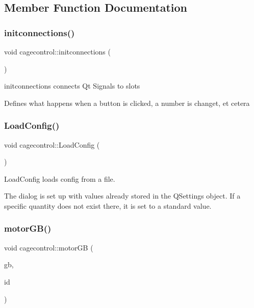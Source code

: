 \subsection{Member Function Documentation}
\mbox{\label{classcagecontrol_a56c01018dbd0d16a360106c438539c9e}} 
\subsubsection{\texorpdfstring{initconnections()}{initconnections()}}
{\footnotesize\ttfamily void cagecontrol\+::initconnections (\begin{DoxyParamCaption}{ }\end{DoxyParamCaption})\hspace{0.3cm}{\ttfamily [private]}}



initconnections connects Qt Signals to slots 

Defines what happens when a button is clicked, a number is changet, et cetera \mbox{\label{classcagecontrol_a0e6648cef5e6d08d638aa2472824cb6b}} 
\subsubsection{\texorpdfstring{Load\+Config()}{LoadConfig()}}
{\footnotesize\ttfamily void cagecontrol\+::\+Load\+Config (\begin{DoxyParamCaption}{ }\end{DoxyParamCaption})\hspace{0.3cm}{\ttfamily [private]}}



Load\+Config loads config from a file. 

The dialog is set up with values already stored in the Q\+Settings object. If a specific quantity does not exist there, it is set to a standard value. \mbox{\label{classcagecontrol_a2fd60ea2aa138472e3714dbd25cadc55}} 
\subsubsection{\texorpdfstring{motor\+G\+B()}{motorGB()}}
{\footnotesize\ttfamily void cagecontrol\+::motor\+GB (\begin{DoxyParamCaption}\item[{Q\+Group\+Box $\ast$}]{gb,  }\item[{Q\+String}]{id }\end{DoxyParamCaption})\hspace{0.3cm}{\ttfamily [private]}}



